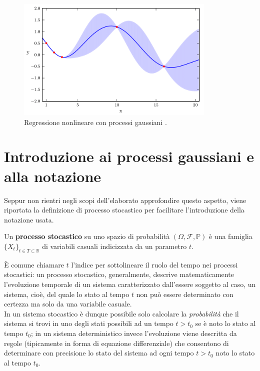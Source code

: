 \begin{oss}
\begin{figure}[h]
    \centering
    \includegraphics[width=0.85\textwidth]{images/Gaussian process/motivazione4.png}
    \caption{Regressione nonlineare con processi gaussiani \cite{turner_gaussian_2016}.}
    \label{nonlinearRegressionGaussianProcess}
\end{figure}

\end{oss}

\newpage

\section{Introduzione ai processi gaussiani e alla notazione}
Seppur non rientri negli scopi dell'elaborato approfondire questo aspetto, viene riportata la definizione di processo stocastico per facilitare l'introduzione della notazione usata.



\begin{defi}
Un \textbf{processo stocastico} su uno spazio di probabilità $(\Omega, \mathcal{F}, \mathbb{P})$ è una famiglia $\{X_t\}_{t\in T\subset \mathbb{R}}$ di variabili casuali indicizzata da un parametro $t$.
\end{defi}



È comune chiamare $t$ l'indice per sottolineare il ruolo del tempo nei processi stocastici: un processo stocastico, generalmente, descrive matematicamente l'evoluzione temporale di un sistema caratterizzato dall'essere soggetto al caso, un sistema, cioè, del quale lo stato al tempo $t$ non può essere determinato con certezza ma solo da una variabile casuale.\\
In un sistema stocastico è dunque possibile solo calcolare la \textit{probabilità} che il sistema si trovi in uno degli stati possibili ad un tempo $t>t_0$ se è noto lo stato al tempo $t_0$; in un sistema deterministico invece l'evoluzione viene descritta da regole (tipicamente in forma di equazione differenziale) che consentono di determinare con precisione lo stato del sistema ad ogni tempo $t>t_0$ noto lo stato al tempo $t_0$.




